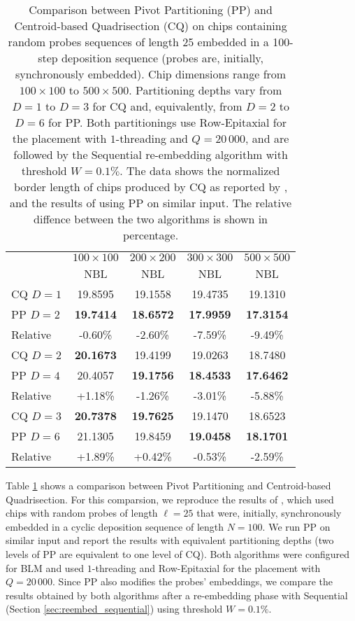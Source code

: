 \begin{table}[t!]\centering
\caption{\label{tab:pp_x_cq}
  Comparison between Pivot Partitioning (PP) and Centroid-based Quadrisection
  (CQ) on chips containing random probes sequences of length 25 embedded in a
  100-step deposition sequence (probes are, initially, synchronously embedded).
  Chip dimensions range from $100\times 100$ to $500\times 500$. Partitioning
  depths vary from $D=1$ to $D=3$ for CQ and, equivalently, from $D=2$ to $D=6$
  for PP. Both partitionings use Row-Epitaxial for the placement with
  $1$-threading and $Q = 20\,000$, and are followed by the Sequential
  re-embedding algorithm with threshold $W=0.1\%$. The data shows the normalized
  border length of chips produced by CQ as reported by \citet{Kahng2003a}, and
  the results of using PP on similar input. The relative diffence between the
  two algorithms is shown in percentage.}
\footnotesize{
\begin{tabular}{lcccc}
\vspace{1pt}
 & $100\times 100$ & $200\times 200$ & $300\times 300$ & $500\times 500$ \\
\cline{2-5}
\vspace{1pt}
 & NBL             & NBL             & NBL             & NBL \\
\hline
CQ $D=1$ &      19.8595  &      19.1558  &      19.4735  &      19.1310  \\
PP $D=2$ & {\bf 19.7414} & {\bf 18.6572} & {\bf 17.9959} & {\bf 17.3154} \\
Relative &      -0.60\%  &      -2.60\%  &      -7.59\%  &      -9.49\%  \\
\hline
CQ $D=2$ & {\bf 20.1673} &      19.4199  &      19.0263  &      18.7480  \\
PP $D=4$ &      20.4057  & {\bf 19.1756} & {\bf 18.4533} & {\bf 17.6462} \\
Relative &     +1.18\%   &      -1.26\%  &      -3.01\%  &      -5.88\%  \\
\hline
CQ $D=3$ & {\bf 20.7378} & {\bf 19.7625} &      19.1470  &      18.6523  \\
PP $D=6$ &      21.1305  &      19.8459  & {\bf 19.0458} & {\bf 18.1701} \\
Relative &     +1.89\%   &      +0.42\%  &      -0.53\%  &      -2.59\%  \\
\hline
\end{tabular}}
\end{table}

Table \ref{tab:pp_x_cq} shows a comparison between Pivot Partitioning and
Centroid-based Quadrisection. For this comparsion, we reproduce the results of
\citet{Kahng2003a}, which used chips with random probes of length $\ell=25$ that
were, initially, synchronously embedded in a cyclic deposition sequence of
length $N=100$. We run PP on similar input and report the results with
equivalent partitioning depths (two levels of PP are equivalent to one level of
CQ). Both algorithms were configured for BLM and used $1$-threading and
Row-Epitaxial for the placement with $Q = 20\,000$. Since PP also modifies the
probes' embeddings, we compare the results obtained by both algorithms after a
re-embedding phase with Sequential (Section \ref{sec:reembed_sequential}) using
threshold $W=0.1\%$.

